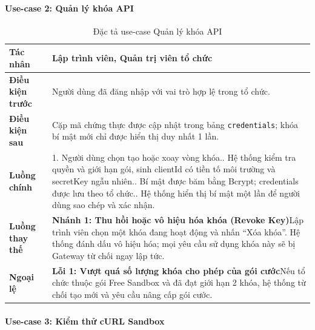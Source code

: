 \paragraph{Use-case 2: Quản lý khóa API}

\begingroup
\small
\begin{longtable}{|p{3.2cm}|p{\dimexpr\linewidth-3.2cm-4\tabcolsep-3\arrayrulewidth\relax}|}
\caption{Đặc tả use-case Quản lý khóa API}
\label{aihub:tab:uc_manage_credentials}\\
\hline
\textbf{Tác nhân} & Lập trình viên, Quản trị viên tổ chức \\ \hline
\textbf{Điều kiện trước} & Người dùng đã đăng nhập với vai trò hợp lệ trong tổ chức. \\ \hline
\textbf{Điều kiện sau} & Cặp mã chứng thực được cập nhật trong bảng \texttt{credentials}; khóa bí mật mới chỉ được hiển thị duy nhất 1 lần. \\ \hline
\textbf{Luồng chính} & 1. Người dùng chọn tạo hoặc xoay vòng khóa.\newline 2. Hệ thống kiểm tra quyền và giới hạn gói, sinh clientId có tiền tố môi trường và secretKey ngẫu nhiên.\newline 3. Bí mật được băm bằng Bcrypt; credentials được lưu theo tổ chức.\newline 4. Hệ thống hiển thị bí mật một lần để người dùng sao chép và xác nhận. \\ \hline
\textbf{Luồng thay thế} &
\textbf{Nhánh 1: Thu hồi hoặc vô hiệu hóa khóa (Revoke Key)}\newline Lập trình viên chọn một khóa đang hoạt động và nhấn ``Xóa khóa''. Hệ thống đánh dấu vô hiệu hóa; mọi yêu cầu sử dụng khóa này sẽ bị Gateway từ chối ngay lập tức. \\ \hline
\textbf{Ngoại lệ} &
\textbf{Lỗi 1: Vượt quá số lượng khóa cho phép của gói cước}\newline Nếu tổ chức thuộc gói Free Sandbox và đã đạt giới hạn 2 khóa, hệ thống từ chối tạo mới và yêu cầu nâng cấp gói cước. \\ \hline
\end{longtable}
\endgroup

\paragraph{Use-case 3: Kiểm thử cURL Sandbox}

